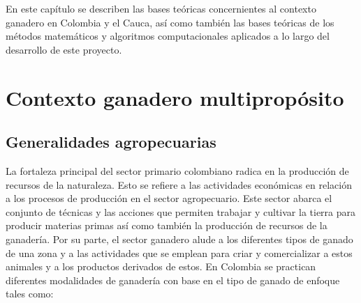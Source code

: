 
En este capítulo se describen las bases teóricas  concernientes al contexto ganadero en Colombia y el Cauca, así como también las bases teóricas de los métodos matemáticos y algoritmos computacionales aplicados a lo largo del desarrollo de este proyecto.




\section{Contexto ganadero multipropósito} \label{contexgan}
\subsection{Generalidades agropecuarias} \label{tgan}


La fortaleza principal del sector primario colombiano radica en la producción de recursos de la naturaleza. Esto se refiere a las actividades económicas en relación a los procesos de producción en el sector agropecuario. Este sector abarca el conjunto de técnicas y las acciones que permiten trabajar y cultivar la tierra para producir materias primas así como también la producción de recursos de la ganadería. Por su parte, el sector ganadero alude a los diferentes tipos de ganado de una zona y a las actividades que se emplean para criar y comercializar a estos animales y a los productos derivados de estos. En Colombia se practican diferentes modalidades de ganadería con base en el tipo de ganado de enfoque tales como:

